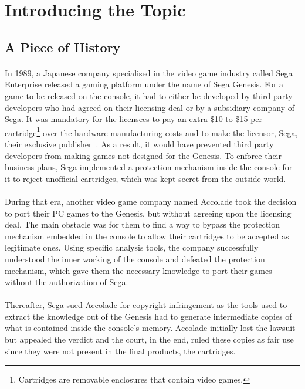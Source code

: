 \section{Introducing the Topic}

\subsection{A Piece of History}
\paragraph{}
In 1989, a Japanese company specialised in the video game industry called Sega Enterprise released a gaming platform under the name of Sega Genesis. For a game to be released on the console, it had to either be developed by third party developers who had agreed on their licensing deal or by a subsidiary company of Sega. It was mandatory for the licensees to pay an extra \$10 to \$15 per cartridge\footnote{Cartridges are removable enclosures that contain video games.} over the hardware manufacturing costs and to make the licensor, Sega, their exclusive publisher~\cite{Kent:2001:UHV:559522}. As a result, it would have prevented third party developers from making games not designed for the Genesis. To enforce their business plans, Sega implemented a protection mechanism inside the console for it to reject unofficial cartridges, which was kept secret from the outside world.

\paragraph{}
During that era, another video game company named Accolade took the decision to port their PC games to the Genesis, but without agreeing upon the licensing deal. The main obstacle was for them to find a way to bypass the protection mechanism embedded in the console to allow their cartridges to be accepted as legitimate ones. Using specific analysis tools, the company successfully understood the inner working of the console and defeated the protection mechanism, which gave them the necessary knowledge to port their games without the authorization of Sega.

\paragraph{}
Thereafter, Sega sued Accolade for copyright infringement as the tools used to extract the knowledge out of the Genesis had to generate intermediate copies of what is contained inside the console's memory. Accolade initially lost the lawsuit but appealed the verdict and the court, in the end, ruled these copies as fair use since they were not present in the final products, the cartridges. 

